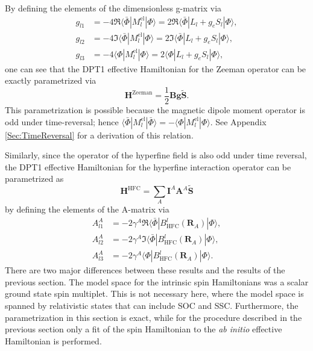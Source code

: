 By defining the elements of the dimensionless g-matrix via\cite{LanCY_2015_1750}
	\begin{align}
	\label{Eq:gl1}
	{g_{l1}} &=  - 4\Re \langle \bar \Phi |M_l^{{\text{el}}}|\Phi \rangle  = 2\Re \langle \bar \Phi |{L_l} + {g_e}{S_l}|\Phi \rangle,  \\
	\label{Eq:gl2}
	{g_{l2}} &=  - 4\Im \langle \bar \Phi |M_l^{{\text{el}}}|\Phi \rangle  = 2\Im \langle \bar \Phi |{L_l} + {g_e}{S_l}|\Phi \rangle, \\
	\label{Eq:gl3}
	{g_{l3}} &=  - 4\langle \Phi |M_l^{{\text{el}}}|\Phi \rangle  = 2\langle \Phi |{L_l} + {g_e}{S_l}|\Phi \rangle, 
	\end{align} 	
one can see that the DPT1 effective Hamiltonian for the Zeeman operator can be exactly parametrized via
	\begin{equation}
	{{\mathbf{H}}^{{\text{Zeeman}}}} = \frac{1}{2}{\mathbf{B}} {\mathbf{g}} \tilde {\mathbf{S}}.
	\end{equation} 	
This parametrization is possible because the magnetic dipole moment operator is odd under time-reversal; hence $\langle \bar \Phi |M_l^{{\text{el}}}|\bar \Phi \rangle  =  - \langle \Phi |M_l^{{\text{el}}}|\Phi \rangle $. See Appendix \ref{Sec:TimeReversal} for a derivation of this relation.

Similarly, since the operator of the hyperfine field is also odd under time reversal, the DPT1 effective Hamiltonian for the hyperfine interaction operator can be parametrized as
	\begin{equation}
	{{\mathbf{H}}^{{\text{HFC}}}} = \sum\limits_A {{{\mathbf{I}}^A}} {\mathbf{A}^A} \tilde {\mathbf{S}}
	\end{equation} 	
by defining the elements of the A-matrix via
	\begin{align}
	\label{Eq:Al1}
	A_{l1}^A &=  - 2{\gamma ^A}\Re \langle \bar \Phi |B_{{\text{HFC}}}^l({{\mathbf{R}}_A})|\Phi \rangle,  \\
	\label{Eq:Al2}
	A_{l2}^A &=  - 2{\gamma ^A}\Im \langle \bar \Phi |B_{{\text{HFC}}}^l({{\mathbf{R}}_A})|\Phi \rangle, \\
	\label{Eq:Al3}
	A_{l3}^A &=  - 2{\gamma ^A}\langle \Phi |B_{{\text{HFC}}}^l({{\mathbf{R}}_A})|\Phi \rangle. 
	\end{align}
There are two major differences between these results and the results of the previous section. The model space for the intrinsic spin Hamiltonians was a scalar ground state spin multiplet. This is not necessary here, where the model space is spanned by relativistic states that can include SOC and SSC. Furthermore, the parametrization in this section is exact, while for the procedure described in the previous section only a fit of the spin Hamiltonian to the \textit{ab initio} effective Hamiltonian is performed.


